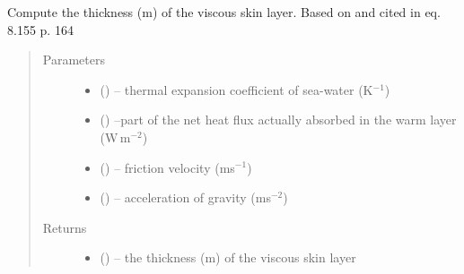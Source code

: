 \documentclass[letterpaper,10pt,english]{sphinxmanual}
\begin{document}
\begin{fulllineitems}
\label{\detokenize{index:cs_wl_subs.delta}}
Compute the thickness (m) of the viscous skin layer. Based on \citet{Fairall_etal_1996b} and cited in \citet{era5_2019} eq. 8.155 p. 164
\begin{quote}\begin{description}
\item[{Parameters}] \leavevmode\begin{itemize}
\item {} 
 (\href{https://docs.python.org/3/library/functions.html\#float}{}) -- thermal expansion coefficient of sea-water  (K$^{-1}$)

\item {} 
 (\href{https://docs.python.org/3/library/functions.html\#float}{}) --part of the net heat flux actually absorbed in the warm layer (W\,m$^{-2}$)

\item {} 
 (\href{https://docs.python.org/3/library/functions.html\#float}{}) -- friction velocity (ms$^{-1}$)

\item {} 
 (\href{https://docs.python.org/3/library/functions.html\#float}{}) -- acceleration of gravity (ms$^{-2}$)

\end{itemize}

\item[{Returns}] \leavevmode
\begin{itemize}
\item {} 
 (\href{https://docs.python.org/3/library/functions.html\#float}{}) -- the thickness (m) of the viscous skin layer
\end{itemize}

\end{description}\end{quote}
\end{fulllineitems}

\end{document}
